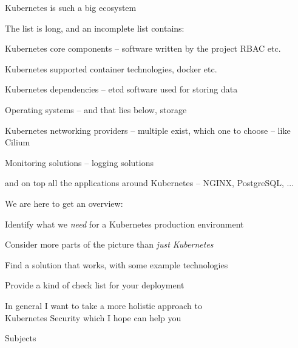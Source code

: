 \documentclass[Screen16to9,17pt]{foils}
\begin{document}
\begin{list1}
\item Kubernetes is such a big ecosystem
\item The list is long, and an incomplete list contains:
\begin{list2}
\item Kubernetes core components -- software written by the project RBAC etc.
\item Kubernetes supported container technologies, docker etc.
\item Kubernetes dependencies -- etcd software used for storing data
\item Operating systems -- and that lies below, storage
\item Kubernetes networking providers -- multiple exist, which one to choose -- like Cilium
\item Monitoring solutions -- logging solutions
\end{list2}
\item and on top all the applications around Kubernetes -- NGINX, PostgreSQL, ...
\end{list1}


We are here to get an overview:
\begin{list2}
\item Identify what we \emph{need} for a Kubernetes production environment
\item Consider more parts of the picture than \emph{just Kubernetes}
\item Find a solution that works, with some example technologies
\item Provide a kind of check list for your deployment
\end{list2}

In general I want to take a more holistic approach to \\
Kubernetes Security which I hope can help you




\begin{list1}
\item Subjects
\begin{list2}
\item
\item
\item
\item
\end{list2}
\end{list1}
\end{document}

